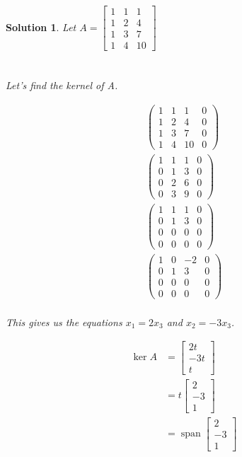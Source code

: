 \documentclass{article}
\newtheorem*{solution}{Solution}
\DeclareMathOperator{\Span}{span}
\begin{document}
\begin{solution}
Let $A = \begin{bmatrix} 1 & 1 & 1 \\ 1 & 2 & 4 \\ 1 & 3 & 7 \\ 1 & 4 & 10 \end{bmatrix}$ \\
\\ \\
Let's find the kernel of A.

\begin{align*}
\left( \begin{array}{ccc|c} 1 & 1 & 1 & 0 \\ 1 & 2 & 4 & 0 \\ 1 & 3 & 7 & 0 \\ 1 & 4 & 10 & 0 \end{array} \right) \\
\left( \begin{array}{ccc|c} 1 & 1 & 1 & 0 \\ 0 & 1 & 3 & 0 \\ 0 & 2 & 6 & 0 \\ 0 & 3 & 9 & 0 \end{array} \right) \\
\left( \begin{array}{ccc|c} 1 & 1 & 1 & 0 \\ 0 & 1 & 3 & 0 \\ 0 & 0 & 0 & 0 \\ 0 & 0 & 0 & 0 \end{array} \right) \\
\left( \begin{array}{ccc|c} 1 & 0 & -2 & 0 \\ 0 & 1 & 3 & 0 \\ 0 & 0 & 0 & 0 \\ 0 & 0 & 0 & 0 \end{array} \right) \\
\end{align*}

This gives us the equations $x_{1} = 2x_{3}$ and $x_{2} = -3x_{3}$. 

\begin{align*}
\ker A &= \begin{bmatrix} 2t \\ -3t \\ t \end{bmatrix} \\
&= t \begin{bmatrix} 2 \\ -3 \\ 1 \end{bmatrix} \\
&= \Span \begin{bmatrix} 2 \\ -3 \\ 1 \end{bmatrix}
\end{align*}


\end{solution}
\end{document}
